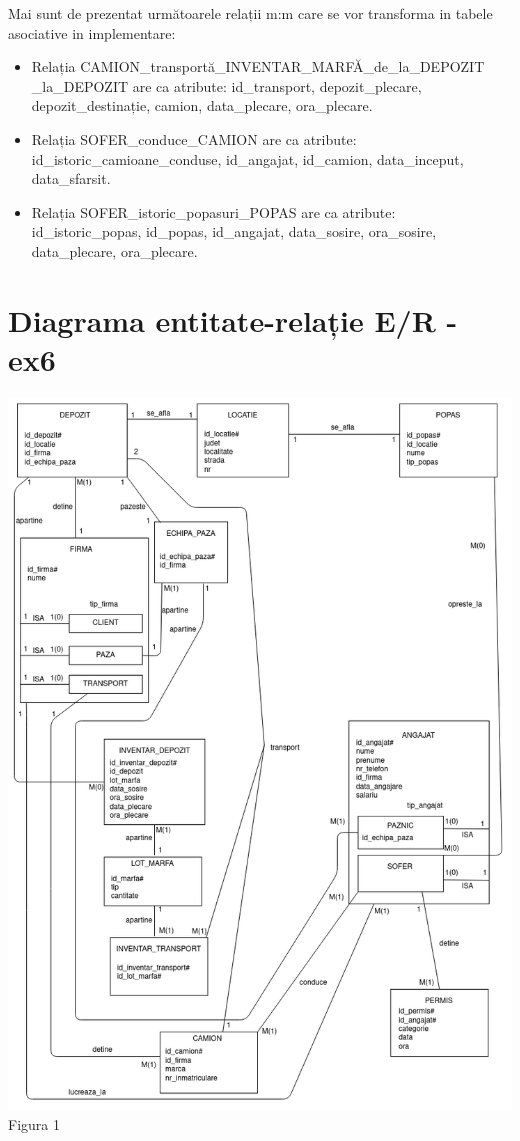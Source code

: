 \documentclass[12pt, a4paper]{article}
\begin{document}
    Mai sunt de prezentat următoarele relații m:m care se vor transforma in tabele asociative in implementare:
\begin{itemize}
    \item Relația CAMION\_transportă\_INVENTAR\_MARFĂ\_de\_la\_DEPOZIT\\\_la\_DEPOZIT are ca atribute: id\_transport, depozit\_plecare,\\ depozit\_destinație, camion, data\_plecare, ora\_plecare.
    \item Relația SOFER\_conduce\_CAMION are ca atribute: \\id\_istoric\_camioane\_conduse, id\_angajat, id\_camion, data\_inceput,\\ data\_sfarsit.
    \item Relația SOFER\_istoric\_popasuri\_POPAS are ca atribute: \\id\_istoric\_popas, id\_popas, id\_angajat, data\_sosire, ora\_sosire,\\ data\_plecare, ora\_plecare.
\end{itemize}

\newpage
\section{Diagrama entitate-relație E/R - ex6}
\includegraphics[width=\textwidth]{_diagrama_er.png}
\label{Figura 1}
\centering Figura 1
\end{document}
